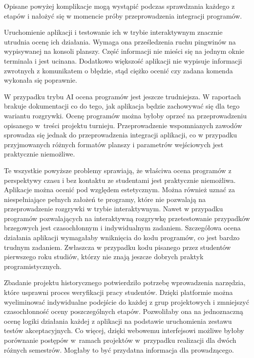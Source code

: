 Opisane powyżej komplikacje mogą wystąpić podczas sprawdzania każdego z etapów i nałożyć się w momencie próby przeprowadzenia integracji programów.

Uruchomienie aplikacji i testowanie ich w trybie interaktywnym znacznie utrudnia ocenę ich działania.
Wymaga ona prześledzenia ruchu pingwinów na wypisywanej na konsoli planszy.
Część informacji nie mieści się na jednym oknie terminala i jest ucinana.
Dodatkowo większość aplikacji nie wypisuje informacji zwrotnych z komunikatem o błędzie, stąd ciężko ocenić czy zadana komenda wykonała się poprawnie.

W przypadku trybu AI ocena programów jest jeszcze trudniejsza.
W raportach brakuje dokumentacji co do tego, jak aplikacja będzie zachowywać się dla tego wariantu rozgrywki.
Ocenę programów można byłoby oprzeć na przeprowadzeniu opisanego w~treści projektu turnieju.
Przeprowadzenie wspomnianych zawodów sprowadza się jednak do przeprowadzenia integracji aplikacji, co w przypadku przyjmowanych różnych formatów planszy i parametrów wejściowych jest praktycznie niemożliwe.

Te wszystkie powyższe problemy sprawiają, że właściwa ocena programów z perspektywy czasu i bez kontaktu ze studentami jest praktycznie niemożliwa.
Aplikacje można ocenić pod względem estetycznym.
Można również uznać za niespełniające pełnych założeń te programy, które nie pozwalają na przeprowadzenie rozgrywki w trybie interaktywnym.
Nawet w przypadku programów pozwalających na interaktywną rozgrywkę przetestowanie przypadków brzegowych jest czasochłonnym i indywidualnym zadaniem.
Szczegółowa ocena działania aplikacji wymagałaby wniknięcia do kodu programów, co jest bardzo trudnym zadaniem.
Zwłaszcza w przypadku kodu pisanego przez studentów pierwszego roku studiów, którzy nie znają jeszcze dobrych praktyk programistycznych.

Zbadanie projektu historycznego potwierdziło potrzebę wprowadzenia narzędzia, które usprawni proces weryfikacji pracy studentów.
Dzięki platformie można wyeliminować indywidualne podejście do każdej z grup projektowych i zmniejszyć czasochłonność oceny poszczególnych etapów.
Pozwoliłaby ona na jednoznaczną ocenę logiki działania każdej z aplikacji na podstawie uruchomienia zestawu testów akceptacyjnych.
Co więcej, dzięki webowemu interfejsowi możliwe byłoby porównanie postępów w~ramach projektów w~przypadku realizacji dla dwóch różnych semestrów.
Mogłaby to być przydatna informacja dla prowadzącego.

